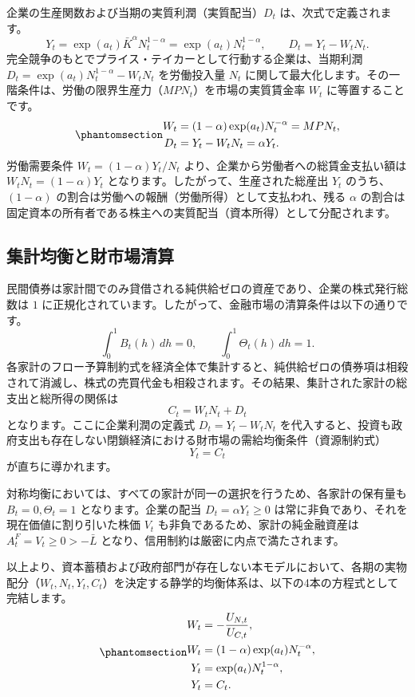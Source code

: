\documentclass[
  japanese,
  lualatex,
  ja=standard,
  12pt,
  a4paper]{ltjsarticle}
\begin{document}
企業の生産関数および当期の実質利潤（実質配当）\(D_t\)
は、次式で定義されます。 \[
Y_t = \exp(a_t) \bar{K}^\alpha N_t^{1-\alpha} = \exp(a_t) N_t^{1-\alpha}, \qquad D_t = Y_t - W_t N_t.
\] 完全競争のもとでプライス・テイカーとして行動する企業は、当期利潤
\(D_t = \exp(a_t) N_t^{1-\alpha} - W_t N_t\) を労働投入量 \(N_t\)
に関して最大化します。その一階条件は、労働の限界生産力（\(MPN_t\)）を市場の実質賃金率
\(W_t\) に等置することです。
\begin{equation}\protect\phantomsection\label{eq-firm-conditions}{
\begin{aligned}
W_t &= (1-\alpha) \exp(a_t) N_t^{-\alpha} = MPN_t,\\
D_t &= Y_t - W_t N_t = \alpha Y_t.
\end{aligned}
}\end{equation} 労働需要条件 \(W_t = (1-\alpha) Y_t / N_t\)
より、企業から労働者への総賃金支払い額は \(W_t N_t = (1-\alpha) Y_t\)
となります。したがって、生産された総産出 \(Y_t\) のうち、\((1-\alpha)\)
の割合は労働への報酬（労働所得）として支払われ、残る \(\alpha\)
の割合は固定資本の所有者である株主への実質配当（資本所得）として分配されます。

\subsection{集計均衡と財市場清算}\label{ux96c6ux8a08ux5747ux8861ux3068ux8ca1ux5e02ux5834ux6e05ux7b97}

民間債券は家計間でのみ貸借される純供給ゼロの資産であり、企業の株式発行総数は
\(1\)
に正規化されています。したがって、金融市場の清算条件は以下の通りです。
\[
\int_0^1 B_t(h)\,dh = 0, \qquad \int_0^1 \Theta_t(h)\,dh = 1.
\]
各家計のフロー予算制約式を経済全体で集計すると、純供給ゼロの債券項は相殺されて消滅し、株式の売買代金も相殺されます。その結果、集計された家計の総支出と総所得の関係は
\[
C_t = W_t N_t + D_t
\] となります。ここに企業利潤の定義式 \(D_t = Y_t - W_t N_t\)
を代入すると、投資も政府支出も存在しない閉鎖経済における財市場の需給均衡条件（資源制約式）
\[
Y_t = C_t
\] が直ちに導かれます。

対称均衡においては、すべての家計が同一の選択を行うため、各家計の保有量も
\(B_t = 0, \Theta_t = 1\) となります。企業の配当
\(D_t = \alpha Y_t \geq 0\)
は常に非負であり、それを現在価値に割り引いた株価 \(V_t\)
も非負であるため、家計の純金融資産は \(A_t^F = V_t \geq 0 > -\bar{L}\)
となり、信用制約は厳密に内点で満たされます。

以上より、資本蓄積および政府部門が存在しない本モデルにおいて、各期の実物配分（\(W_t, N_t, Y_t, C_t\)）を決定する静学的均衡体系は、以下の4本の方程式として完結します。
\begin{equation}\protect\phantomsection\label{eq-static-equilibrium}{
\begin{aligned}
W_t &= -\frac{U_{N,t}}{U_{C,t}},\\
W_t &= (1-\alpha) \exp(a_t) N_t^{-\alpha},\\
Y_t &= \exp(a_t) N_t^{1-\alpha},\\
Y_t &= C_t.
\end{aligned}
}\end{equation}
\end{document}
